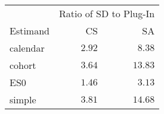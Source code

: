 \captionsetup[table]{labelformat=empty,skip=1pt}
\begin{longtable}{lrr}
\toprule
 & \multicolumn{2}{c}{Ratio of SD to Plug-In} \\ 
 \cmidrule(lr){2-3}
Estimand & CS & SA \\ 
\midrule
calendar & $2.92$ & $8.38$ \\ 
cohort & $3.64$ & $13.83$ \\ 
ES0 & $1.46$ & $3.13$ \\ 
simple & $3.81$ & $14.68$ \\ 
 \bottomrule
\end{longtable}

